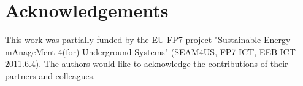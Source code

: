 \section*{Acknowledgements}
\label{sec:acknowledgements}

This work was partially funded by the EU-FP7 project "Sustainable Energy mAnageMent 4(for) Underground Systems" (SEAM4US, FP7-ICT, EEB-ICT-2011.6.4). The authors would like to acknowledge the contributions of their partners and colleagues.

